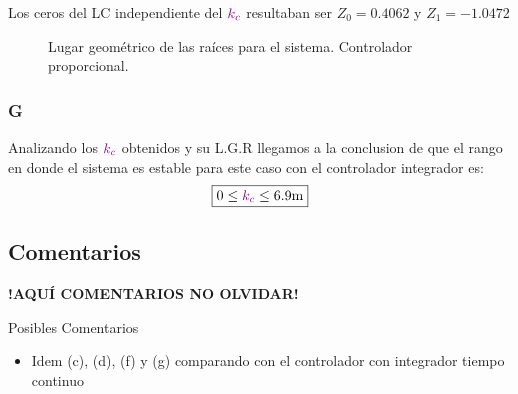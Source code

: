 Los ceros del LC independiente del \(\mathbin{\color{violet}k_c}\) resultaban ser $Z_{0} = 0.4062 $ y $Z_{1} = -1.0472$ 

\begin{figure}[ht]
  \centering
  
  \caption{Lugar geométrico de las raíces para el sistema. Controlador proporcional.}
  \label{fig:lgr-j2}
\end{figure}

\FloatBarrier
\subsubsection{G}%
 Analizando los \(\mathbin{\color{violet}k_c}\) obtenidos y su L.G.R llegamos a la
conclusion de que el rango en donde el sistema es estable para este caso con el controlador integrador es:
\begin{equation}
  \boxed{ 0 \leq \mora{k_{c}} \leq 6.9\unit{m} }
\end{equation}

\FloatBarrier
\subsection{Comentarios}


\textbf{!AQUÍ COMENTARIOS NO OLVIDAR!}

Posibles Comentarios
\begin{itemize}
    \item Idem (c), (d), (f) y (g) comparando con el controlador con integrador tiempo continuo
\end{itemize}
